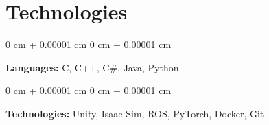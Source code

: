 \documentclass[10pt, letterpaper]{article}
\newenvironment{onecolentry}{
    \begin{adjustwidth}{
        0 cm + 0.00001 cm
    }{
        0 cm + 0.00001 cm
    }
}{
    \end{adjustwidth}
} %
\begin{document}
    
    \section{Technologies}
        \begin{onecolentry}
            \textbf{Languages:} C, C++, C\#, Java, Python
        \end{onecolentry}

        \vspace{0.2 cm}

        \begin{onecolentry}
            \textbf{Technologies:} Unity, Isaac Sim, ROS, PyTorch, Docker, Git
        \end{onecolentry}
\end{document}
